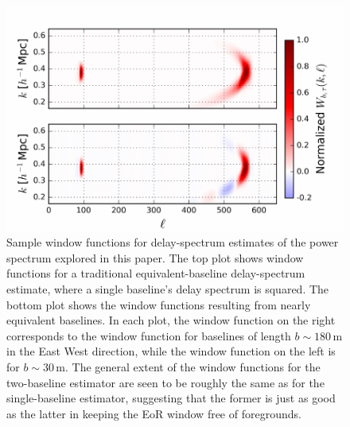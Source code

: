 \documentclass[twocolumn,apj,numberedappendix]{emulateapj}
\renewcommand\[{\begin{equation}}
\renewcommand\]{\end{equation}}
\begin{document}
\begin{figure}[h]
\includegraphics[width=1.1\linewidth]{multiblwindows}
\caption{Sample window functions for delay-spectrum estimates of the power spectrum explored in this paper. The top plot shows window functions for a traditional equivalent-baseline delay-spectrum estimate, where a single baseline's delay spectrum is squared. The bottom plot shows the window functions resulting from nearly equivalent baselines. In each plot, the window function on the right corresponds to the window function for baselines of length $b \sim 180\,\textrm{m}$ in the East West direction, while the window function on the left is for $b\sim 30\,\textrm{m}$. The general extent of the window functions for the two-baseline estimator are seen to be roughly the same as for the single-baseline estimator, suggesting that the former is just as good as the latter in keeping the EoR window free of foregrounds.}
\label{fig:multiblwindows}
\end{figure}
\end{document}
